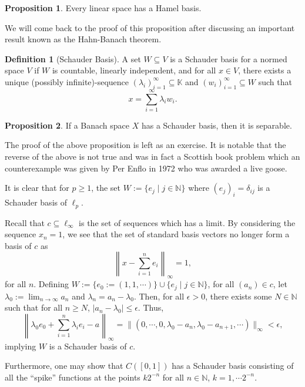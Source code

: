 \documentclass[]{article}
\theoremstyle{definition}
\theoremstyle{definition}
\newtheorem{definition}{Definition}[section]
\newtheorem{proposition}{Proposition}[section]
\begin{document}
\begin{proposition}
  Every linear space has a Hamel basis.
\end{proposition}
We will come back to the proof of this proposition after discussing an important 
result known as the Hahn-Banach theorem.

\begin{definition}[Schauder Basis]
  A set \(W \subseteq V\) is a Schauder basis for a normed space \(V\) if 
  \(W\) is countable, linearly independent, and for all \(x \in V\), there 
  exists a unique (possibly infinite)-sequence 
  \((\lambda_i)_{i = 1}^\infty \subseteq \mathbb{K}\) and 
  \((w_i)_{i = 1}^\infty \subseteq W\) such that
  \[x = \sum_{i = 1}^\infty \lambda_i w_i.\]
\end{definition}

\begin{proposition}
  If a Banach space \(X\) has a Schauder basis, then it is separable.
\end{proposition}

The proof of the above proposition is left as an exercise. It is notable that 
the reverse of the above is not true and was in fact a Scottish book problem 
which an counterexample was given by Per Enflo in 1972 who was awarded a live 
goose.

It is clear that for \(p \ge 1\), the set \(W := \{e_j \mid j \in \mathbb{N}\}\) 
where \((e_j)_i = \delta_{ij}\) is a Schauder basis of \(\ell_p\). 

Recall that \(c \subseteq \ell_\infty\) is the set of sequences which has 
a limit. By considering the sequence \(x_n = 1\), we see that the set of 
standard basis vectors no longer form a basis of \(c\) as 
\[\left\|x - \sum^n_{i = 1} e_i\right\|_\infty = 1,\]
for all \(n\). Defining \(W := \{e_0 := (1, 1, \cdots)\} \cup 
\{e_j \mid j \in \mathbb{N}\}\), for all \((a_n) \in c\), let 
\(\lambda_0 := \lim_{n \to \infty} a_n\) and \(\lambda_n = a_n - \lambda_0\).
Then, for all \(\epsilon > 0\), there exists some \(N \in \mathbb{N}\) such that 
for all \(n \ge N\), \(|a_n - \lambda_0| \leq \epsilon\). Thus, 
\[\left\|\lambda_0 e_0 + \sum_{i = 1}^n \lambda_i e_i - a\right\|_\infty 
  = \|(0, \cdots, 0, \lambda_0 - a_n, \lambda_0 - a_{n + 1}, \cdots)\|_\infty
  < \epsilon,\]
implying \(W\) is a Schauder basis of \(c\).

Furthermore, one may show that \(C([0, 1])\) has a Schauder basis consisting of 
all the ``spike'' functions at the points \(k2^{-n}\) for all \(n \in \mathbb{N}\), 
\(k = 1, \cdots 2^{-n}\).
\end{document}
